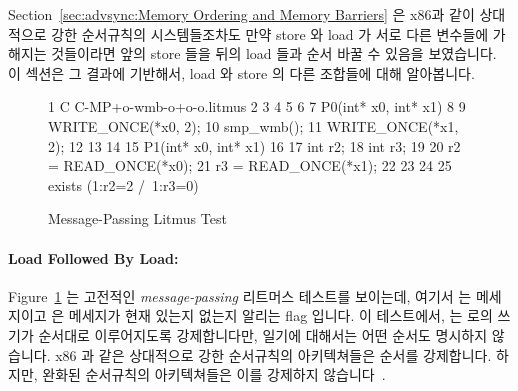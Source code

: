 Section~\ref{sec:advsync:Memory Ordering and Memory Barriers}
은 x86과 같이 상대적으로 강한 순서규칙의 시스템들조차도 만약 store 와 load 가
서로 다른 변수들에 가해지는 것들이라면 앞의 store 들을 뒤의 load 들과 순서 바꿀
수 있음을 보였습니다.
이 섹션은 그 결과에 기반해서, load 와 store 의 다른 조합들에 대해 알아봅니다.

\begin{figure}[tbp]
{ \scriptsize
\begin{verbbox}
 1 C C-MP+o-wmb-o+o-o.litmus
 2
 3 {
 4 }
 5
 6
 7 P0(int* x0, int* x1) {
 8
 9   WRITE_ONCE(*x0, 2);
10   smp_wmb();
11   WRITE_ONCE(*x1, 2);
12
13 }
14
15 P1(int* x0, int* x1) {
16
17   int r2;
18   int r3;
19
20   r2 = READ_ONCE(*x0);
21   r3 = READ_ONCE(*x1);
22
23 }
24
25 exists (1:r2=2 /\ 1:r3=0)
\end{verbbox}
}
\centering
\theverbbox
\caption{Message-Passing Litmus Test}
\label{fig:advsync:Message-Passing Litmus Test}
\end{figure}

\paragraph{Load Followed By Load:}
Figure~\ref{fig:advsync:Message-Passing Litmus Test}
는 고전적인 \emph{message-passing} 리트머스 테스트를 보이는데, 여기서 
는 메세지이고  은 메세지가 현재 있는지 없는지 알리는 flag 입니다.
이 테스트에서,  는  로의 쓰기가 순서대로 이루어지도록
강제합니다만, 일기에 대해서는 어떤 순서도 명시하지 않습니다.
x86 과 같은 상대적으로 강한 순서규칙의 아키텍쳐들은 순서를 강제합니다.
하지만, 완화된 순서규칙의 아키텍쳐들은 이를 강제하지
않습니다~\cite{JadeAlglave2011ppcmem}.

